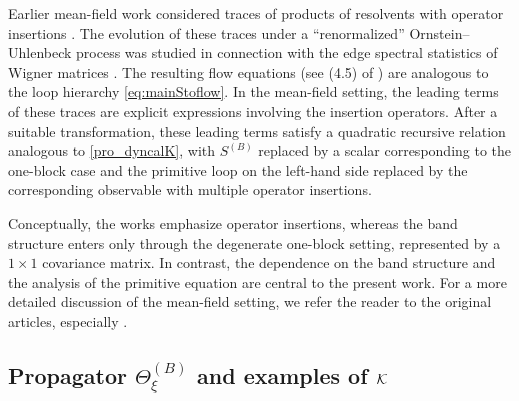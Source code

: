 \documentclass[10pt,reqno]{article}
\theoremstyle{plain} %
\theoremstyle{remark}
\numberwithin{equation}{section}
\begin{document}
 

Earlier mean-field work considered traces of products of resolvents with operator insertions
\cite{CipolloniErdosSchroder2022OptimalMultiResolvent,CipolloniErdosSchroder2022RankUniform}.
The evolution of these traces under a ``renormalized'' Ornstein--Uhlenbeck process was studied in connection with the edge spectral statistics of Wigner matrices \cite{CipolloniErdosHenheik2023EdgeETH}. The resulting flow equations (see (4.5) of \cite{CipolloniErdosHenheik2023EdgeETH}) are analogous to the loop hierarchy \eqref{eq:mainStoflow}. In the mean-field setting, the leading terms of these traces are explicit expressions involving the insertion operators.
After a suitable transformation, these leading terms satisfy a quadratic recursive relation analogous to \eqref{pro_dyncalK}, with $S^{(B)}$ replaced by a scalar corresponding to the one-block case and the primitive loop on the left-hand side replaced by the corresponding observable with multiple operator insertions.


Conceptually, the works \cite{CipolloniErdosHenheik2023EdgeETH,CipolloniErdosSchroder2022OptimalMultiResolvent,CipolloniErdosSchroder2022RankUniform} emphasize operator insertions, whereas the band structure enters only through the degenerate one-block setting, represented by a $1\times1$ covariance matrix. In contrast, the dependence on the band structure and the analysis of the primitive equation are central to the present work. For a more detailed discussion of the mean-field setting, we refer the reader to the original articles, especially \cite{CipolloniErdosHenheik2023EdgeETH}.







\subsection{Propagator \texorpdfstring{$\Theta_\xi^{(B)}$}{Theta} and examples of \texorpdfstring{${\cal K}$}{ K}}
 
\end{document}
